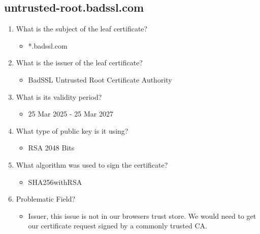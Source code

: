 \documentclass[11pt]{article}
\begin{document}
\subsection{untrusted-root.badssl.com}
\label{sec:org87883ff}
\begin{enumerate}
\item What is the subject of the leaf certificate?
\begin{itemize}
\item *.badssl.com
\end{itemize}
\item What is the issuer of the leaf certificate?
\begin{itemize}
\item BadSSL Untrusted Root Certificate Authority
\end{itemize}
\item What is its validity period?
\begin{itemize}
\item 25 Mar 2025 - 25 Mar 2027
\end{itemize}
\item What type of public key is it using?
\begin{itemize}
\item RSA 2048 Bits
\end{itemize}
\item What algorithm was used to sign the certificate?
\begin{itemize}
\item SHA256withRSA
\end{itemize}
\item Problematic Field?
\begin{itemize}
\item Issuer, this issue is not in our browsers trust store. We would need to get our certificate request signed by a commonly trusted CA.
\end{itemize}
\end{enumerate}
\end{document}
